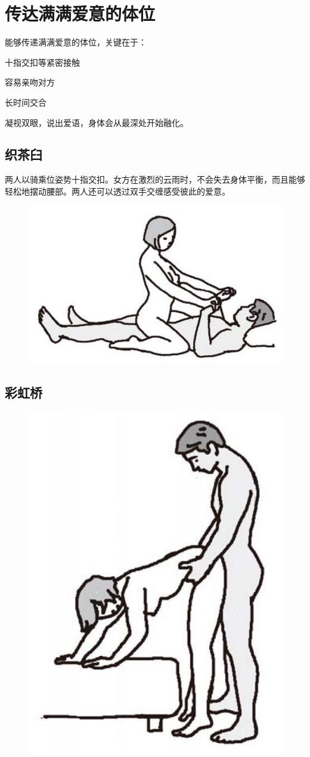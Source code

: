 \documentclass[12pt,UTF8]{ctexbook}
\begin{document}
\section{传达满满爱意的体位}

能够传递满满爱意的体位，关键在于：

十指交扣等紧密接触

容易亲吻对方

长时间交合

凝视双眼，说出爱语，身体会从最深处开始融化。

\subsection{织茶臼}

两人以骑乘位姿势十指交扣。女方在激烈的云雨时，不会失去身体平衡，而且能够轻松地摆动腰部。两人还可以透过双手交缠感受彼此的爱意。

\begin{figure}[htbp]
	\centering
	\includegraphics[width=0.7\linewidth]{tw13}
	\caption{}
	\label{fig:1}
\end{figure}

\subsection{彩虹桥}

\begin{figure}[htbp]
	\centering
	\includegraphics[width=0.7\linewidth]{tw12}
	\caption{}
	\label{fig:1}
\end{figure}
\end{document}
